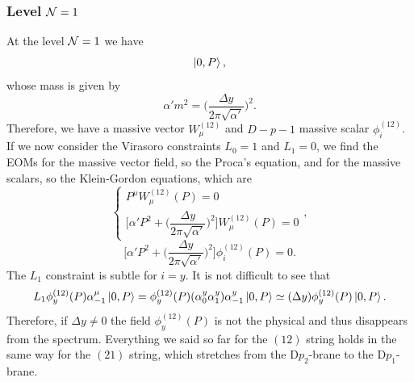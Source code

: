 \subsubsection{Level \texorpdfstring{$\mathcal{N} = 1$}{N = 1}}
At the level $\mathcal{N} = 1$ we have 
\begin{equation}
    [W_\mu^{(12)}(P)\alpha^\mu_{-1} + \phi_i^{(12)}\alpha_{-1}^i]\ket{0,P},
\end{equation}
whose mass is given by 
\begin{equation}
\label{eq: mass open string 2-Dp-branes system N = 1}
    \alpha'm^2 = \bigg(\frac{\Delta y}{2\pi\sqrt{\alpha'}}\bigg)^2.
\end{equation}
Therefore, we have a massive vector $W_\mu^{(12)}$ and $D - p - 1$ massive scalar $\phi_i^{(12)}$. If we now consider the Virasoro constraints $L_0 = 1$ and $L_1 = 0$, we find the EOMs for the massive vector field, so the Proca's equation, and for the massive scalars, so the Klein-Gordon equations, which are 
\begin{equation}
    \begin{cases}
        P^\mu W^{(12)}_\mu(P) = 0 \\[2ex]
        \bigg[\alpha'P^2 + \bigg(\dfrac{\Delta y}{2\pi\sqrt{\alpha'}}\bigg)^2\bigg]W^{(12)}_\mu(P) = 0
    \end{cases},
\end{equation}
\begin{equation}
    \bigg[\alpha'P^2 + \bigg(\dfrac{\Delta y}{2\pi\sqrt{\alpha'}}\bigg)^2\bigg]\phi^{(12)}_i(P) = 0.
\end{equation}
The $L_1$ constraint is subtle for $i = y$. It is not difficult to see that 
\begin{equation}
    L_1\phi_y^{(12)}(P)\alpha^\mu_{-1}\ket{0,P} = \phi_y^{(12)}(P)(\alpha^y_0\alpha^y_1)\alpha^y_{-1}\ket{0,P} \simeq (\Delta y)\phi_y^{(12)}(P)\ket{0,P}.
\end{equation}
Therefore, if $\Delta y \neq 0$ the field $\phi_y^{(12)}(P)$ is not the physical and thus disappears from the spectrum. Everything we said so far for the $(12)$ string holds in the same way for the $(21)$ string, which stretches from the D$p_2$-brane to the D$p_1$-brane. 

